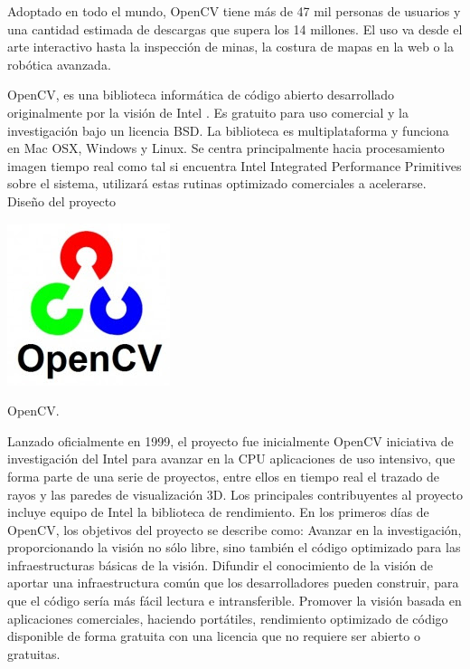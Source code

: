 \documentclass[12pt]{article}
\begin{document}
Adoptado en todo el mundo, OpenCV tiene más de 47 mil personas de usuarios y una cantidad estimada de descargas que supera los 14 millones. El uso va desde el arte interactivo hasta la inspección de minas, la costura de mapas en la web o la robótica avanzada. \cite{OpenCVWebSite}


OpenCV, es una biblioteca informática de código abierto desarrollado originalmente por la visión de Intel . Es gratuito para uso comercial y la investigación bajo un licencia BSD. La biblioteca es multiplataforma y funciona en Mac OSX, Windows y Linux. Se centra principalmente hacia procesamiento imagen tiempo real como tal si encuentra Intel Integrated Performance Primitives sobre el sistema, utilizará estas rutinas optimizado comerciales a acelerarse.
Diseño del proyecto

\includegraphics[width=\textwidth]{unnamed (9).jpg}

OpenCV.

Lanzado oficialmente en 1999, el proyecto fue inicialmente OpenCV iniciativa de investigación del Intel para avanzar en la CPU aplicaciones de uso intensivo, que forma parte de una serie de proyectos, entre ellos en tiempo real el trazado de rayos y las paredes de visualización 3D. Los principales contribuyentes al proyecto incluye equipo de Intel la biblioteca de rendimiento. En los primeros días de OpenCV, los objetivos del proyecto se describe como:
Avanzar en la investigación, proporcionando la visión no sólo libre, sino también el código optimizado para las infraestructuras básicas de la visión.
Difundir el conocimiento de la visión de aportar una infraestructura común que los desarrolladores pueden construir, para que el código sería más fácil lectura e intransferible.
Promover la visión basada en aplicaciones comerciales, haciendo portátiles, rendimiento optimizado de código disponible de forma gratuita con una licencia que no requiere ser abierto o gratuitas.
\end{document}
